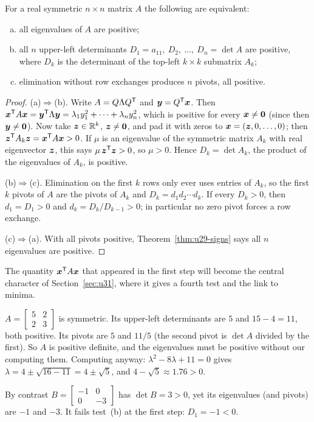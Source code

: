 \begin{theorem}\label{thm:u29-pdtests}
For a real symmetric $n\times n$ matrix $A$ the following are equivalent:
\begin{enumerate}[(a)]
  \item all eigenvalues of $A$ are positive;
  \item all $n$ upper-left determinants $D_1=a_{11},\ D_2,\ \dots,\ D_n=\det A$ are positive,
        where $D_k$ is the determinant of the top-left $k\times k$ submatrix $A_k$;
  \item elimination without row exchanges produces $n$ pivots, all positive.
\end{enumerate}
\end{theorem}
\begin{proof}
(a)$\Rightarrow$(b). Write $A=Q\Lambda Q^{\mathsf{T}}$ and $\boldsymbol{y}=Q^{\mathsf{T}}\boldsymbol{x}$. Then
$\boldsymbol{x}^{\mathsf{T}} A\boldsymbol{x}=\boldsymbol{y}^{\mathsf{T}}\Lambda\boldsymbol{y}=\lambda_1y_1^2+\cdots+\lambda_ny_n^2$, which is positive for every
$\boldsymbol{x}\ne\boldsymbol{0}$ (since then $\boldsymbol{y}\ne\boldsymbol{0}$). Now take $\boldsymbol{z}\in\mathbb{R}^k$, $\boldsymbol{z}\ne\boldsymbol{0}$, and pad it with
zeros to $\boldsymbol{x}=(\boldsymbol{z},0,\dots,0)$; then $\boldsymbol{z}^{\mathsf{T}} A_k\boldsymbol{z}=\boldsymbol{x}^{\mathsf{T}} A\boldsymbol{x}>0$. If $\mu$ is an eigenvalue of
the symmetric matrix $A_k$ with real eigenvector $\boldsymbol{z}$, this says $\mu\,\boldsymbol{z}^{\mathsf{T}}\boldsymbol{z}>0$, so $\mu>0$.
Hence $D_k=\det A_k$, the product of the eigenvalues of $A_k$, is positive.

(b)$\Rightarrow$(c). Elimination on the first $k$ rows only ever uses entries of $A_k$, so the
first $k$ pivots of $A$ are the pivots of $A_k$ and $D_k=d_1d_2\cdots d_k$. If every $D_k>0$, then
$d_1=D_1>0$ and $d_k=D_k/D_{k-1}>0$; in particular no zero pivot forces a row exchange.

(c)$\Rightarrow$(a). With all pivots positive, Theorem~\ref{thm:u29-signs} says all $n$
eigenvalues are positive.
\end{proof}

The quantity $\boldsymbol{x}^{\mathsf{T}} A\boldsymbol{x}$ that appeared in the first step will become the central character
of Section~\ref{sec:u31}, where it gives a fourth test and the link to minima.

\begin{example}\label{ex:u29-532}
$A=\begin{bmatrix}5&2\\2&3\end{bmatrix}$ is symmetric. Its upper-left determinants are $5$ and
$15-4=11$, both positive. Its pivots are $5$ and $11/5$ (the second pivot is $\det A$ divided by
the first). So $A$ is positive definite, and the eigenvalues must be positive without our
computing them. Computing anyway: $\lambda^2-8\lambda+11=0$ gives $\lambda=4\pm\sqrt{16-11}=4\pm\sqrt5$,
and $4-\sqrt5\approx1.76>0$.

By contrast $B=\begin{bmatrix}-1&0\\0&-3\end{bmatrix}$ has $\det B=3>0$, yet its eigenvalues
(and pivots) are $-1$ and $-3$. It fails test~(b) at the first step: $D_1=-1<0$.
\end{example}

